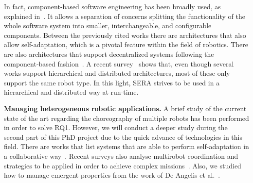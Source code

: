 In fact, component-based software engineering has been broadly used, as explained in~\cite{Brugali2009}. 
It allows a separation of concerns splitting the functionality of the whole software system into smaller, interchangeable, and configurable components. 
Between the previously cited works there are architectures that also allow self-adaptation, which is a pivotal feature within the field of robotics.
There are also architectures that support decentralized systems following the component-based fashion~\cite{Lesire2016}.
A recent survey~\cite{Yan2013} shows that, even though several works support hierarchical and distributed architectures, most of these only support the same robot type. 
In this light, SERA strives to be used in a hierarchical and distributed way at run-time.

\textbf{Managing heterogeneous robotic applications.}
A brief study of the current state of the art regarding the choreography of multiple robots has been performed in order to solve RQ1.
However, we will conduct a deeper study during the second part of this PhD project due to the quick advance of technologies in this field.
There are works that list systems that are able to perform self-adaptation in a collaborative way~\cite{DeLemos2013}.
Recent surveys also analyse multirobot coordination and strategies to be applied in order to achieve complex missions~\cite{Yan2013}.
Also, we studied how to manage emergent properties from the work of De Angelis et al.~\cite{DeAngelis2015,DeAngelis2016}.
